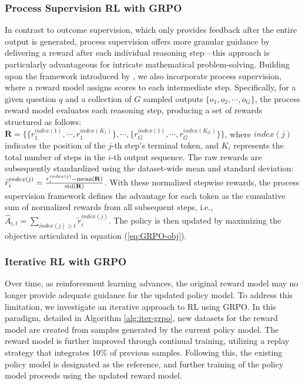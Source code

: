 \begin{itemize}[topsep=0pt]
\begin{itemize}[topsep=0pt]
\subsubsection{Process Supervision RL with GRPO} In contrast to outcome supervision, which only provides feedback after the entire output is generated, process supervision offers more granular guidance by delivering a reward after each individual reasoning step—this approach is particularly advantageous for intricate mathematical problem-solving. Building upon the framework introduced by \cite{wang2023math}, we also incorporate process supervision, where a reward model assigns scores to each intermediate step. Specifically, for a given question $q$ and a collection of $G$ sampled outputs $\{o_1, o_2, \cdots, o_G\}$, the process reward model evaluates each reasoning step, producing a set of rewards structured as follows: $\mathbf{R} = \{ \{r_1^{index(1)},\cdots,r_1^{index(K_1)}\}, \cdots,  \{r_G^{index(1)},\cdots,r_G^{index(K_G)}\} \}$, where $index(j)$ indicates the position of the $j$-th step's terminal token, and $K_i$ represents the total number of steps in the $i$-th output sequence. The raw rewards are subsequently standardized using the dataset-wide mean and standard deviation: $\widetilde{r}_i^{index(j)} = \frac{r_i^{index(j)} - {\rm mean(\mathbf{R})}}{{\rm std(\mathbf{R})}}$.
With these normalized stepwise rewards, the process supervision framework defines the advantage for each token as the cumulative sum of normalized rewards from all subsequent steps, i.e., $\hat{A}_{i, t} = \sum_{index(j) \ge t} \widetilde{r}_i^{index(j)}$.
The policy is then updated by maximizing the objective articulated in equation (\ref{eq:GRPO-obj}).

\subsubsection{Iterative RL with GRPO} Over time, as reinforcement learning advances, the original reward model may no longer provide adequate guidance for the updated policy model. To address this limitation, we investigate an iterative approach to RL using GRPO. In this paradigm, detailed in Algorithm \ref{alg:iter-grpo}, new datasets for the reward model are created from samples generated by the current policy model. The reward model is further improved through continual training, utilizing a replay strategy that integrates 10\% of previous samples. Following this, the existing policy model is designated as the reference, and further training of the policy model proceeds using the updated reward model.


\end{itemize}
\end{itemize}
